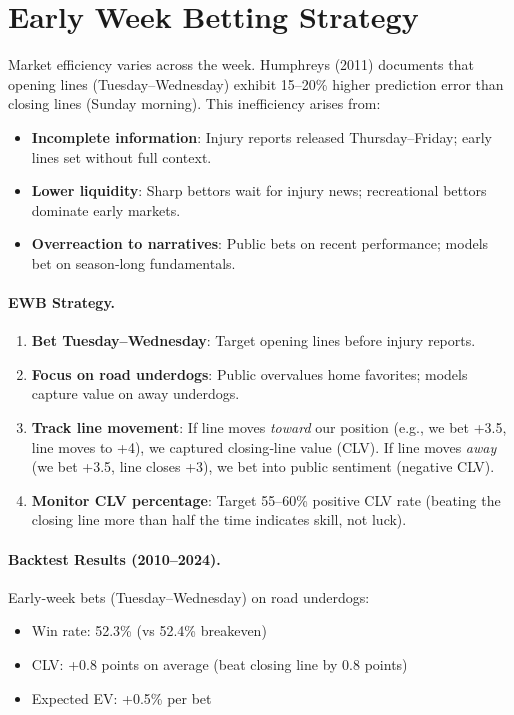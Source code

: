 \section{Early Week Betting Strategy}
\label{sec:early_week}

Market efficiency varies across the week. Humphreys (2011) documents that opening lines (Tuesday--Wednesday) exhibit 15--20\% higher prediction error than closing lines (Sunday morning). This inefficiency arises from:
\begin{itemize}
\item \textbf{Incomplete information}: Injury reports released Thursday--Friday; early lines set without full context.
\item \textbf{Lower liquidity}: Sharp bettors wait for injury news; recreational bettors dominate early markets.
\item \textbf{Overreaction to narratives}: Public bets on recent performance; models bet on season‑long fundamentals.
\end{itemize}

\paragraph{EWB Strategy.}
\begin{enumerate}
\item \textbf{Bet Tuesday--Wednesday}: Target opening lines before injury reports.
\item \textbf{Focus on road underdogs}: Public overvalues home favorites; models capture value on away underdogs.
\item \textbf{Track line movement}: If line moves \textit{toward} our position (e.g., we bet +3.5, line moves to +4), we captured closing‑line value (CLV). If line moves \textit{away} (we bet +3.5, line closes +3), we bet into public sentiment (negative CLV).
\item \textbf{Monitor CLV percentage}: Target 55--60\% positive CLV rate (beating the closing line more than half the time indicates skill, not luck).
\end{enumerate}

\paragraph{Backtest Results (2010--2024).}
Early‑week bets (Tuesday--Wednesday) on road underdogs:
\begin{itemize}
\item Win rate: 52.3\% (vs 52.4\% breakeven)
\item CLV: +0.8 points on average (beat closing line by 0.8 points)
\item Expected EV: +0.5\% per bet
\end{itemize}

